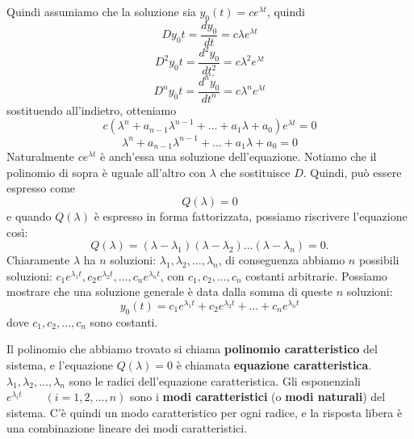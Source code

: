 \documentclass[a4paper, titlepage]{article}
\begin{document}
Quindi assumiamo che la soluzione sia $y_0(t)=ce^{\lambda t}$, quindi
$$ Dy_0{t}=\frac{dy_0}{dt}=c\lambda e^{\lambda t} $$
$$ D^2y_0{t}=\frac{d^2y_0}{dt^2}=c\lambda^2 e^{\lambda t} $$
$$ ... $$
$$ D^ny_0{t}=\frac{d^ny_0}{dt^n}=c\lambda^n e^{\lambda t} $$
sostituendo all'indietro, otteniamo
$$ c(\lambda^n+a_{n-1}\lambda^{n-1}+...+a_1\lambda+a_0)e^{\lambda t}=0 $$
$$ \lambda^n+a_{n-1}\lambda^{n-1}+...+a_1\lambda+a_0 = 0 $$
Naturalmente $ce^{\lambda t}$ è anch'essa una soluzione dell'equazione. Notiamo che il polinomio di sopra
è uguale all'altro con $\lambda$ che sostituisce $D$. Quindi, può essere espresso come
$$ Q(\lambda)=0$$
e quando $Q(\lambda)$ è espresso in forma fattorizzata, possiamo riscrivere l'equazione così:
$$ Q(\lambda) = (\lambda-\lambda_1)(\lambda-\lambda_2)...(\lambda-\lambda_n)=0 .$$
Chiaramente $\lambda$ ha $n$ soluzioni: $\lambda_1, \lambda_2, ..., \lambda_n$, di conseguenza abbiamo $n$ possibili soluzioni: $c_1e^{\lambda_1t},c_2e^{\lambda_2t},...,c_ne^{\lambda_nt}$, con $c_1,c_2,...,c_n$ costanti arbitrarie.
Possiamo mostrare che una soluzione generale è data dalla somma di queste $n$ soluzioni:
$$ y_0(t)=c_1e^{\lambda_1t}+c_2e^{\lambda_2t}+...+c_ne^{\lambda_nt}$$
dove $c_1,c_2,...,c_n$ sono costanti.

Il polinomio che abbiamo trovato si chiama \textbf{polinomio caratteristico} del sistema, e l'equazione
$Q(\lambda)=0$ è chiamata \textbf{equazione caratteristica}.
$\lambda_1, \lambda_2, ..., \lambda_n$ sono le radici dell'equazione caratteristica. Gli esponenziali $e^{\lambda_i t} \qquad (i=1,2,...,n)$ sono i \textbf{modi caratteristici} (o \textbf{modi naturali}) del sistema.
C'è quindi un modo caratteristico per ogni radice, e la risposta libera è una combinazione lineare dei modi caratteristici.
\end{document}
